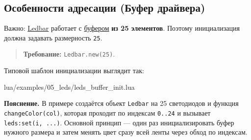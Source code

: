 \subsection{Особенности адресации (Буфер драйвера)}
Важно: \hyperlink{term:ledbar}{Ledbar} работает с \hyperlink{term:buffer}{буфером} \textbf{из 25 элементов}. Поэтому инициализация должна задавать размерность \verb|25|.
\begin{quote}
\textbf{Требование:} \verb|Ledbar.new(25)|.
\end{quote}

Типовой шаблон инициализации выглядит так:

\begin{codefile}{lua/examples/05_leds/leds_buffer_init.lua}
\end{codefile}

\textbf{Пояснение.} В примере создаётся объект \verb|Ledbar| на 25 светодиодов и функция \verb|changeColor(col)|, которая проходит по индексам \verb|0..24| и вызывает \verb|leds:set(i, ...)|. Основной принцип — один раз инициализировать буфер нужного размера и затем менять цвет сразу всей ленты через обход по индексам.
